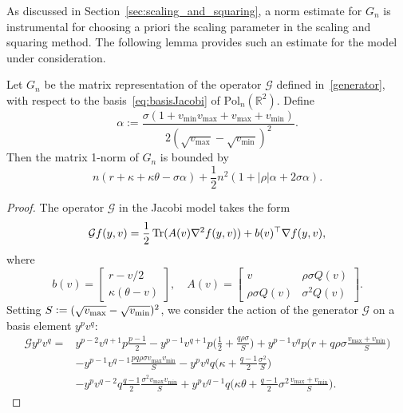 As discussed in Section~\ref{sec:scaling_and_squaring}, a norm estimate for $G_n$ is instrumental for choosing a priori the scaling parameter in the scaling and squaring method. The following lemma provides such an estimate for the model under consideration. 
\begin{lemma} \label{lemmanormJ}
Let $G_n$ be the matrix representation of the operator $\mathcal{G}$ defined in~\eqref{generator}, with respect to the basis~\eqref{eq:basisJacobi} of $\mathrm{Pol}_{n}(\mathbb{R}^2)$.  Define 
\begin{equation*}
\alpha:=\frac{\sigma (1+v_{\min}v_{\max}+v_{\max}+v_{\min})}{2(\sqrt{v_{\max}}-\sqrt{v_{\min}})^2}.
\end{equation*}
Then the matrix 1-norm of $G_n$ is bounded by
\begin{equation*}
n( r + \kappa + \kappa\theta - \sigma \alpha ) + \frac12 n^2 ( 1 + |\rho| \alpha + 2 \sigma \alpha).
\end{equation*}
\begin{proof}
The operator $\mathcal{G}$ in the Jacobi model takes the form
\begin{equation*}
\mathcal{G}f(y,v)=\frac{1}{2}\operatorname{Tr}(A(v) \nabla^2 f(y,v))+b(v)^\top \nabla f(y,v),
\end{equation*}
where 
\begin{equation*}
b(v)=\begin{bmatrix}
  r-v/2 \\
  \kappa(\theta -v)
\end{bmatrix},
 \quad 
A(v)=\begin{bmatrix}
  v & \rho \sigma Q(v)\\
 \rho \sigma Q(v) &  \sigma^2 Q(v)
\end{bmatrix}.
\end{equation*} 
Setting $S\mathrel{\mathop:}= (\sqrt{v_{\max}}-\sqrt{v_{\min}})^2$, we consider the action of the generator $\mathcal{G}$ on a basis element $y^pv^q$:
\begin{align*}
\mathcal{G} y^p v^q=&y^{p-2} v^{q+1}p \frac{p-1}{2} - y^{p-1}v^{q+1} p \Big(\frac{1}{2}+\frac{q\rho \sigma}{S}\Big)+y^{p-1} v^qp \Big(r+q \rho \sigma \frac{v_{\max} + v_{\min}}{S}\Big)\\
& -y^{p-1}v^{q-1}\frac{pq \rho \sigma v_{\max} v_{\min}}{S} - y^p v^q q \Big(\kappa + \frac{q-1}{2} \frac{\sigma^2}{S} \Big) \\
& - y^p v^{q-2} q \frac{q-1}{2} \frac{\sigma^2 v_{\max}v_{\min}}{S} +y^p v^{q-1} q \Big(\kappa \theta + \frac{q-1}{2} \sigma^2 \frac{ v_{\max} + v_{\min}}{S} \Big). 
\end{align*}

\end{proof}
\end{lemma}
